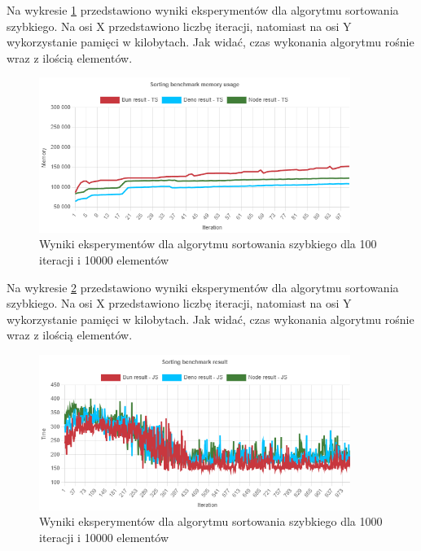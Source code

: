 Na wykresie \ref{fig:quick_sorting_e5_memory_ts} przedstawiono wyniki eksperymentów dla algorytmu sortowania szybkiego. Na osi X przedstawiono liczbę iteracji, natomiast na osi Y wykorzystanie pamięci w kilobytach. Jak widać, czas wykonania algorytmu rośnie wraz z ilością elementów.
\begin{figure}[H]
  \centering
  \includegraphics[width=0.9\textwidth]{Figures/sorting/quick/e5_memory_ts.png}
  \caption{Wyniki eksperymentów dla algorytmu sortowania szybkiego dla 100 iteracji i 10000 elementów}
  \label{fig:quick_sorting_e5_memory_ts}
\end{figure}

Na wykresie \ref{fig:quick_sorting_e6} przedstawiono wyniki eksperymentów dla algorytmu sortowania szybkiego. Na osi X przedstawiono liczbę iteracji, natomiast na osi Y wykorzystanie pamięci w kilobytach. Jak widać, czas wykonania algorytmu rośnie wraz z ilością elementów.
\begin{figure}[H]
  \centering
  \includegraphics[width=0.9\textwidth]{Figures/sorting/quick/e6_js.png}
  \caption{Wyniki eksperymentów dla algorytmu sortowania szybkiego dla 1000 iteracji i 10000 elementów}
  \label{fig:quick_sorting_e6}
\end{figure}

